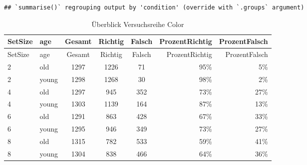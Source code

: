 \documentclass[
]{article}
\newenvironment{Shaded}{\begin{snugshade}}{\end{snugshade}}
\newcommand{\DataTypeTok}[1]{\textcolor[rgb]{0.13,0.29,0.53}{#1}}
\newcommand{\DecValTok}[1]{\textcolor[rgb]{0.00,0.00,0.81}{#1}}
\newcommand{\KeywordTok}[1]{\textcolor[rgb]{0.13,0.29,0.53}{\textbf{#1}}}
\newcommand{\NormalTok}[1]{#1}
\newcommand{\OperatorTok}[1]{\textcolor[rgb]{0.81,0.36,0.00}{\textbf{#1}}}
\newcommand{\StringTok}[1]{\textcolor[rgb]{0.31,0.60,0.02}{#1}}
\begin{document}
\begin{verbatim}
## `summarise()` regrouping output by 'condition' (override with `.groups` argument)
\end{verbatim}

\begin{longtable}[]{@{}llcccrr@{}}
\caption{Überblick Versuchsreihe Color}\tabularnewline
\toprule
SetSize & age & Gesamt & Richtig & Falsch & ProzentRichtig &
ProzentFalsch\tabularnewline
\midrule
\endfirsthead
\toprule
SetSize & age & Gesamt & Richtig & Falsch & ProzentRichtig &
ProzentFalsch\tabularnewline
\midrule
\endhead
2 & old & 1297 & 1226 & 71 & 95\% & 5\%\tabularnewline
2 & young & 1298 & 1268 & 30 & 98\% & 2\%\tabularnewline
4 & old & 1297 & 945 & 352 & 73\% & 27\%\tabularnewline
4 & young & 1303 & 1139 & 164 & 87\% & 13\%\tabularnewline
6 & old & 1291 & 863 & 428 & 67\% & 33\%\tabularnewline
6 & young & 1295 & 946 & 349 & 73\% & 27\%\tabularnewline
8 & old & 1315 & 782 & 533 & 59\% & 41\%\tabularnewline
8 & young & 1304 & 838 & 466 & 64\% & 36\%\tabularnewline
\bottomrule
\end{longtable}

\begin{Shaded}
\end{Shaded}
\end{document}
